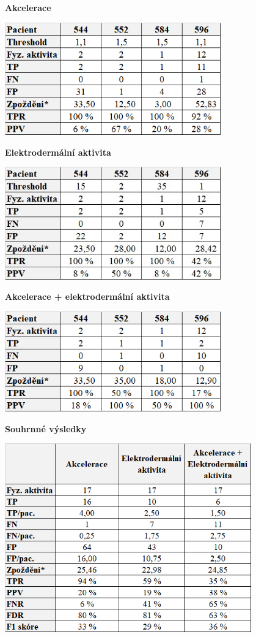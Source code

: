 \begin{table}[H]
\caption{\textbf{Akcelerace}}
\vspace*{1mm}
\label{tab:vys:acc}
\centering
\includegraphics[width=0.7\textwidth]{img/vysledky/pa/7_acc.jpg}
\end{table}

\begin{table}[H]
\caption{\textbf{Elektrodermální aktivita}}
\vspace*{1mm}
\centering
\includegraphics[width=0.7\textwidth]{img/vysledky/pa/8_electro2.jpg}
\end{table}

\begin{table}[H]
\caption{\textbf{Akcelerace + elektrodermální aktivita}}
\label{tab:vys:acc+}
\centering
\includegraphics[width=0.7\textwidth]{img/vysledky/pa/9_acc_electro.png}
\end{table}

\begin{table}[H]
\caption{\textbf{Souhrnné výsledky}}
\label{tab:vys:sum_acc}
\centering
\includegraphics[width=0.8\textwidth]{img/vysledky/pa/vysledky 2.png}
\end{table}

